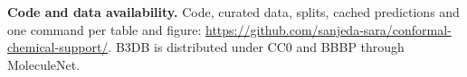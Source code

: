 \documentclass[10pt]{article}
\begin{document}
\textbf{Code and data availability.} Code, curated data, splits, cached predictions and one command per table and figure: \url{https://github.com/sanjeda-sara/conformal-chemical-support/}. B3DB is distributed under CC0 and BBBP through MoleculeNet.


{\small}
\end{document}
